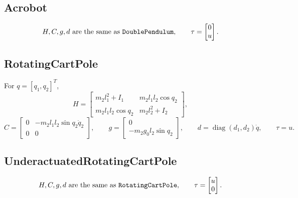 \documentclass[11pt]{article}
\newcommand{\diag}{\operatorname{diag}}
\begin{document}
\subsection{Acrobot}
\begin{equation}
    H,C,g,d \text{ are the same as \texttt{DoublePendulum}}, \qquad
    \tau = \begin{bmatrix}0\\u\end{bmatrix}.
\end{equation}

\subsection{RotatingCartPole}
For \(q=[q_1,q_2]^T\),
\begin{equation}
    H =
    \begin{bmatrix}
        m_2l_1^2+I_1 & m_2l_1l_2\cos q_2 \\
        m_2l_1l_2\cos q_2 & m_2l_2^2+I_2
    \end{bmatrix},
\end{equation}
\begin{equation}
    C =
    \begin{bmatrix}
        0 & -m_2l_1l_2\sin q_2\dot q_2 \\
        0 & 0
    \end{bmatrix},
    \qquad
    g =
    \begin{bmatrix}
        0 \\
        -m_2g_0l_2\sin q_2
    \end{bmatrix},
    \qquad
    d=\diag(d_1,d_2)\dot q,
    \qquad
    \tau=u.
\end{equation}

\subsection{UnderactuatedRotatingCartPole}
\begin{equation}
    H,C,g,d \text{ are the same as \texttt{RotatingCartPole}}, \qquad
    \tau=\begin{bmatrix}u\\0\end{bmatrix}.
\end{equation}
\end{document}

